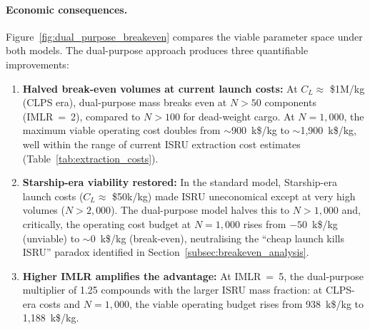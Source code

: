\documentclass[11pt,a4paper]{article}
\begin{document}
\paragraph{Economic consequences.}
Figure~\ref{fig:dual_purpose_breakeven} compares the viable parameter space under both models. The dual-purpose approach produces three quantifiable improvements:
%
\begin{enumerate}[leftmargin=1.4em]
    \item \textbf{Halved break-even volumes at current launch costs:} At $C_L \approx$ \$1M/kg (CLPS era), dual-purpose mass breaks even at $N > 50$ components (IMLR~=~2), compared to $N > 100$ for dead-weight cargo. At $N = 1{,}000$, the maximum viable operating cost doubles from $\sim$900~k\$/kg to $\sim$1{,}900~k\$/kg, well within the range of current ISRU extraction cost estimates (Table~\ref{tab:extraction_costs}).

    \item \textbf{Starship-era viability restored:} In the standard model, Starship-era launch costs ($C_L \approx$ \$50k/kg) made ISRU uneconomical except at very high volumes ($N > 2{,}000$). The dual-purpose model halves this to $N > 1{,}000$ and, critically, the operating cost budget at $N = 1{,}000$ rises from $-50$~k\$/kg (unviable) to $\sim$0~k\$/kg (break-even), neutralising the ``cheap launch kills ISRU'' paradox identified in Section~\ref{subsec:breakeven_analysis}.

    \item \textbf{Higher IMLR amplifies the advantage:} At IMLR~=~5, the dual-purpose multiplier of 1.25 compounds with the larger ISRU mass fraction: at CLPS-era costs and $N = 1{,}000$, the viable operating budget rises from 938~k\$/kg to 1{,}188~k\$/kg.
\end{enumerate}
\end{document}
